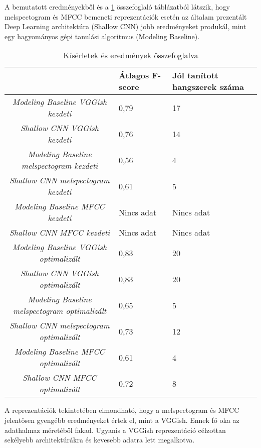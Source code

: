 A bemutatott eredményekből és a \ref{tab:all} összefoglaló táblázatból látszik, hogy melspectogram és MFCC bemeneti reprezentációk esetén az általam prezentált Deep Learning architektúra (Shallow CNN) jobb eredményeket produkál, mint egy hagyományos gépi tanulási algoritmus (Modeling Baseline).

\begin{table}[H]
	\centering
	\begin{tabular}{ | c | p{} | p{} |}
		\hline
		 & \textbf{Átlagos F-score} & \textbf{Jól tanított hangszerek száma}  \\
		\hline \hline
		\emph{Modeling Baseline VGGish kezdeti} & 0,79 & 17 \\
		\hline
		\emph{Shallow CNN VGGish kezdeti} & 0,76 & 14  \\
		\hline
		\emph{Modeling Baseline melspectogram kezdeti} & 0,56 & 4 \\
		\hline
		\emph{Shallow CNN melspectogram kezdeti} & 0,61 & 5 \\
		\hline
		\emph{Modeling Baseline MFCC kezdeti} & Nincs adat & Nincs adat \\
		\hline
		\emph{Shallow CNN MFCC kezdeti} & Nincs adat & Nincs adat \\
		\hline
		\emph{Modeling Baseline VGGish optimalizált} & 0,83 & 20\\
		\hline
		\emph{Shallow CNN VGGish optimalizált} & 0,83 & 20 \\
		\hline
		\emph{Modeling Baseline melspectogram optimalizált} & 0,65 & 5 \\
		\hline
		\emph{Shallow CNN melspectogram optimalizált} & 0,73 & 12 \\
		\hline
		\emph{Modeling Baseline MFCC optimalizált} & 0,61 & 4 \\
		\hline
		\emph{Shallow CNN MFCC optimalizált} & 0,72 & 8 \\
		\hline
	\end{tabular}
	\caption{Kísérletek és eredmények összefoglalva}
	\label{tab:all}
\end{table}


A reprezentációk tekintetében elmondható, hogy a melspectogram és MFCC jelentősen gyengébb eredményeket értek el, mint a VGGish. Ennek fő oka az adathalmaz méretéből fakad. Ugyanis a VGGish reprezentáció célzottan sekélyebb architektúrákra és kevesebb adatra lett megalkotva.